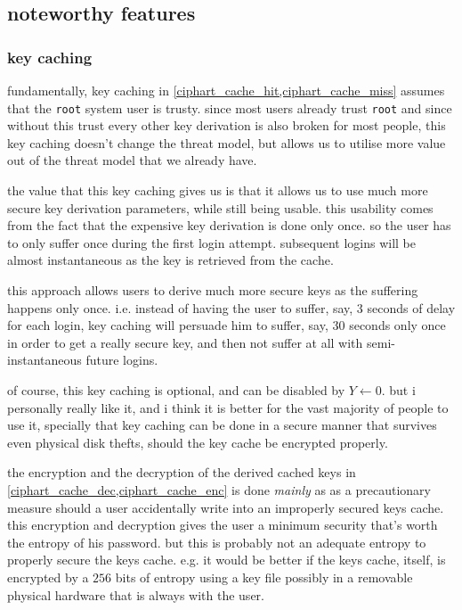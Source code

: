 \documentclass[twocolumn]{article}
\begin{document}
\subsection{noteworthy features}
\subsubsection{key caching}
fundamentally, key caching in \cref{ciphart_cache_hit,ciphart_cache_miss}
assumes that the \texttt{root} system user is trusty.  since most users
already trust \texttt{root} and since without this trust every other key
derivation is also broken for most people, this key caching doesn't change
the threat model, but allows us to utilise more value out of the threat
model that we already have.

the value that this key caching gives us is that it allows us to use much
more secure key derivation parameters, while still being usable.  this
usability comes from the fact that the expensive key derivation is done
only once.  so the user has to only suffer once during the first login
attempt.  subsequent logins will be almost instantaneous as the key is
retrieved from the cache.  

this approach allows users to derive much more secure keys as the suffering
happens only once.  i.e. instead of having the user to suffer, say, $3$
seconds of delay for each login, key caching will persuade him to suffer,
say, $30$ seconds only once in order to get a really secure key, and then
not suffer at all with semi-instantaneous future logins.

of course, this key caching is optional, and can be disabled by $Y \gets
0$.  but i personally really like it, and i think it is better for the vast
majority of people to use it, specially that key caching can be done in a
secure manner that survives even physical disk thefts, should the key cache
be encrypted properly.

the encryption and the decryption of the derived cached keys in
\cref{ciphart_cache_dec,ciphart_cache_enc} is done \emph{mainly} as as a
precautionary measure should a user accidentally write into an improperly
secured keys cache.  this encryption and decryption gives the user a
minimum security that's worth the entropy of his password.  but this is
probably not an adequate entropy to properly secure the keys cache.  e.g.
it would be better if the keys cache, itself, is encrypted by a $256$ bits
of entropy using a key file possibly in a removable physical hardware that
is always with the user.
\end{document}
